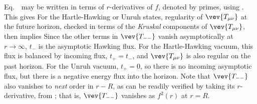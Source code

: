 Eq.~\stress\ may be written in terms of $r$-derivatives of $f$, denoted by primes, using \tortdef.  This gives
\eqn{}
For the Hartle-Hawking  or Unruh  states, regularity of $\vev{T_{\mu\nu}}$ at the future horizon, checked in terms of the {\it Kruskal} components of $\vev{T_{\mu\nu}}$, then implies 
%
\eqn{}
%
Since the other terms in $\vev{T_{--}}$ vanish asymptotically at $r\rightarrow\infty$, $t_-$ is the asymptotic Hawking flux.  For the Hartle-Hawking vacuum, this flux is balanced by incoming flux, $t_+=t_-$, and $\vev{ T_{\mu\nu}}$ is also regular on the past horizon. For the Unruh vacuum, $t_+=0$, so there is no incoming asymptotic flux, but there is a negative energy flux into the horizon.  Note that $\vev{T_{--}}$ also vanishes to {\it next} order in $r-R$, as can be readily verified by taking its $r$-derivative, from \fstress; that is, $\vev{T_{--}}$ vanishes as $f^2(r)$ at $r=R$.

